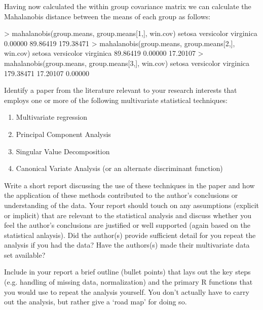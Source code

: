 Having now calculated the within group covariance matrix we can calculate the Mahalanobis distance between the means of each group as follows:

\begin{R}
> mahalanobis(group.means, group.means[1,], win.cov)
    setosa versicolor  virginica
   0.00000   89.86419  179.38471
> mahalanobis(group.means, group.means[2,], win.cov)
    setosa versicolor  virginica
  89.86419    0.00000   17.20107
> mahalanobis(group.means, group.means[3,], win.cov)
    setosa versicolor  virginica
 179.38471   17.20107    0.00000
\end{R}

\medskip
\begin{assignment}
\small

Identify a paper from the literature relevant to your research interests that employs one or more of the following multivariate statistical techniques:

\begin{enumerate}
\item Multivariate regression
\item Principal Component Analysis
\item Singular Value Decomposition
\item Canonical Variate Analysis (or an alternate discriminant function)
\end{enumerate}

Write a short report discussing the use of these techniques in the paper and how the application of these methods contributed to the author's conclusions or understanding of the data.  Your report should touch on any assumptions (explicit or implicit) that are relevant to the statistical analysis and discuss whether you feel the author's conclusions are justified or well supported (again based on the statistical anlaysis).  Did the author(s) provide sufficient detail for you repeat the analysis if you had the data?  Have the authors(s) made their multivariate data set available?

\medskip
Include in your report a brief outline (bullet points) that lays out the key steps (e.g. handling of missing data, normalization) and the primary R functions that you would use to repeat the analysis yourself. You don't actually have to carry out the analysis, but rather give a `road map' for doing so.


\end{assignment}


